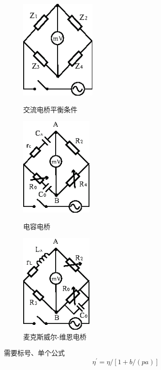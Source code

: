 \documentclass[12pt,a4paper,UTF8]{ctexart}
\begin{document}
	\begin{figure}[htbp]
	\centering
	\begin{minipage}{0.3\textwidth}
	\centering
			\includegraphics[height=5cm]{img//1.eps}
			\caption{交流电桥平衡条件}
	\end{minipage}
	\hfill
	\begin{minipage}{0.3\textwidth}
	\centering
			\includegraphics[height=5cm]{img//2.eps}
			\caption{电容电桥}
	\end{minipage}
	\hfill
	\begin{minipage}{0.3\textwidth}
	\centering
			\includegraphics[height=5cm]{img//3.eps}
			\caption{麦克斯威尔-维恩电桥}
	\end{minipage}
	\end{figure}

 需要标号、单个公式
		\begin{equation}
		\eta^{\prime}=\eta /[1+b /(p a)]
		\end{equation}
\end{document}
